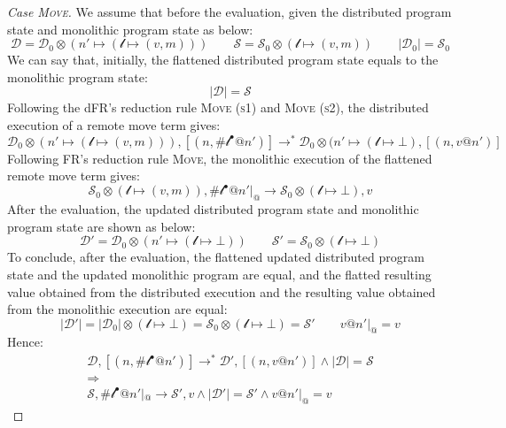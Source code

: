 \begin{proof}[Case \textsc{\emph{Move}}]
We assume that before the evaluation, given the distributed program state and monolithic program state as below:
\[\mathcal{D} = \mathcal{D}_0 \otimes (n' \mapsto (\mathscr{l}\mapsto (v, m)))\quad\quad
\mathcal{S} = \mathcal{S}_0 \otimes (\mathscr{l} \mapsto (v, m))\quad\quad
|\mathcal{D}_0| = \mathcal{S}_0\]
We can say that, initially, the flattened distributed program state equals to the monolithic program state:
\[|\mathcal{D}| = \mathcal{S}\]
Following the dFR's reduction rule \textsc{Move (s1)} and \textsc{Move (s2)}, the distributed execution of a remote move term gives:
\[\mathcal{D}_0 \otimes (n' \mapsto (\mathscr{l} \mapsto (v,m))) , [(n, \#\mathscr{l}^\bullet@n')] \longrightarrow^* \mathcal{D}_0 \otimes (n' \mapsto (\mathscr{l} \mapsto \bot), [(n, v@n')]\]
Following FR's reduction rule \textsc{Move}, the monolithic execution of the flattened remote move term gives:
\[\mathcal{S}_0 \otimes (\mathscr{l} \mapsto (v, m)), \#\mathscr{l}^\bullet@n'|_@ \longrightarrow \mathcal{S}_0 \otimes (\mathscr{l} \mapsto \bot), v\]
After the evaluation, the updated distributed program state and monolithic program state are shown as below:
\[\mathcal{D}' = \mathcal{D}_0 \otimes (n' \mapsto (\mathscr{l} \mapsto \bot)) \quad\quad \mathcal{S}' = \mathcal{S}_0 \otimes (\mathscr{l} \mapsto \bot)\]
To conclude, after the evaluation, the flattened updated distributed program state and the updated monolithic program are equal, and the flatted resulting value obtained from the distributed execution and the resulting value obtained from the monolithic execution are equal:
\[|\mathcal{D}'| = |\mathcal{D}_0| \otimes (\mathscr{l} \mapsto \bot) = \mathcal{S}_0 \otimes (\mathscr{l} \mapsto \bot) = \mathcal{S}' \quad\quad v@n'|_@ = v\]
Hence:
\begin{gather*}
\mathcal{D}, [(n, \#\mathscr{l}^\bullet@n')] \longrightarrow^* \mathcal{D'}, [(n, v@n')] \land |\mathcal{D}| = \mathcal{S} \\\Rightarrow\\ \mathcal{S},  \#\mathscr{l}^\bullet@n'|_@ \longrightarrow \mathcal{S'}, v \land |\mathcal{D}'| = \mathcal{S}' \land v@n'|_@ = v
\end{gather*}

\end{proof}

